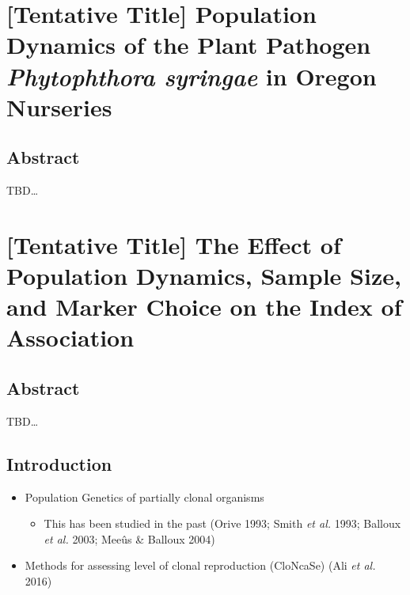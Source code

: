 \documentclass[double,12pt]{beavtex}
\providecommand{\tightlist}{%
  \setlength{\itemsep}{0pt}\setlength{\parskip}{0pt}}
\begin{document}
  \chapter{\texorpdfstring{{[}Tentative Title{]} Population Dynamics of
  the Plant Pathogen \emph{Phytophthora syringae} in Oregon
  Nurseries}{{[}Tentative Title{]} Population Dynamics of the Plant Pathogen Phytophthora syringae in Oregon Nurseries}}\label{tentative-title-population-dynamics-of-the-plant-pathogen-phytophthora-syringae-in-oregon-nurseries}
  
  \section{Abstract}\label{abstract-3}
  
  TBD\ldots{}
  
  \chapter{{[}Tentative Title{]} The Effect of Population Dynamics, Sample
  Size, and Marker Choice on the Index of
  Association}\label{tentative-title-the-effect-of-population-dynamics-sample-size-and-marker-choice-on-the-index-of-association}
  
  \section{Abstract}\label{abstract-4}
  
  TBD\ldots{}
  
  \section{Introduction}\label{introduction-1}
  
  \begin{itemize}
  \tightlist
  \item
    Population Genetics of partially clonal organisms
  
    \begin{itemize}
    \tightlist
    \item
      This has been studied in the past (Orive 1993; Smith \emph{et al.}
      1993; Balloux \emph{et al.} 2003; Meeûs \& Balloux 2004)
    \end{itemize}
  \item
    Methods for assessing level of clonal reproduction (CloNcaSe) (Ali
    \emph{et al.} 2016)
  \end{itemize}
  
\end{document}
